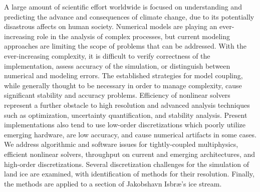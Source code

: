 A large amount of scientific effort worldwide is focused on understanding and predicting the advance and consequences of climate change, due to its potentially disastrous affects on human society.
Numerical models are playing an ever-increasing role in the analysis of complex processes, but current modeling approaches are limiting the scope of problems that can be addressed.
With the ever-increasing complexity, it is difficult to verify correctness of the implementation, assess accuracy of the simulation, or distinguish between numerical and modeling errors.
The established strategies for model coupling, while generally thought to be necessary in order to manage complexity, cause significant stability and accuracy problems.
Efficiency of nonlinear solvers represent a further obstacle to high resolution and advanced analysis techniques such as optimization, uncertainty quantification, and stability analysis.
Present implementations also tend to use low-order discretizations which poorly utilize emerging hardware, are low accuracy, and cause numerical artifacts in some cases.
We address algorithmic and software issues for tightly-coupled multiphysics, efficient nonlinear solvers, throughput on current and emerging architectures, and high-order discretizations.
Several discretization challenges for the simulation of land ice are examined, with identification of methods for their resolution.
Finally, the methods are applied to a section of Jakobshavn Isbr{\ae}'s ice stream.
